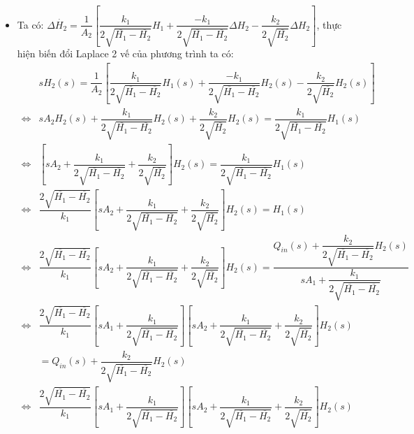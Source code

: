 \begin{enumerate}[\it a.]
\begin{itemize}
                    \item Ta có: $\Delta \dot{H_2} = \dfrac{1}{A_2} \left[{\dfrac{k_1}{2 \sqrt{\overline{H_1} - \overline{H_2}}} H_1 + \dfrac{-k_1}{2 \sqrt{\overline{H_1} - \overline{H_2}}} \Delta H_2 - \dfrac{k_2}{2 \sqrt{\overline{H_2}}} \Delta H_2}\right]$, thực hiện biến đổi Laplace 2 vế của phương trình ta có:
                        \begin{align}
                            & s H_2(s) = \dfrac{1}{A_2} \left[{\dfrac{k_1}{2 \sqrt{\overline{H_1} - \overline{H_2}}} H_1(s) + \dfrac{-k_1}{2 \sqrt{\overline{H_1} - \overline{H_2}}} H_2(s) - \dfrac{k_2}{2 \sqrt{\overline{H_2}}} H_2(s)}\right] \\
                            \Longleftrightarrow & s A_2 H_2(s) + \dfrac{k_1}{2 \sqrt{\overline{H_1} - \overline{H_2}}} H_2(s) + \dfrac{k_2}{2 \sqrt{\overline{H_2}}} H_2(s) = \dfrac{k_1}{2 \sqrt{\overline{H_1} - \overline{H_2}}} H_1(s) \\
                            \Longleftrightarrow & \left[{s A_2 + \dfrac{k_1}{2 \sqrt{\overline{H_1} - \overline{H_2}}} + \dfrac{k_2}{2 \sqrt{\overline{H_2}}}}\right] H_2(s) = \dfrac{k_1}{2 \sqrt{\overline{H_1} - \overline{H_2}}} H_1(s) \\
                            \Longleftrightarrow & \dfrac{2\sqrt{\overline{H_1} - \overline{H_2}}}{k_1} \left[{s A_2 + \dfrac{k_1}{2 \sqrt{\overline{H_1} - \overline{H_2}}} + \dfrac{k_2}{2 \sqrt{\overline{H_2}}}}\right] H_2(s) = H_1(s) \\
                            \Longleftrightarrow & \dfrac{2\sqrt{\overline{H_1} - \overline{H_2}}}{k_1} \left[{s A_2 + \dfrac{k_1}{2 \sqrt{\overline{H_1} - \overline{H_2}}} + \dfrac{k_2}{2 \sqrt{\overline{H_2}}}}\right] H_2(s) = \dfrac{Q_{in}(s) + \dfrac{k_2}{2\sqrt{\overline{H_1} - \overline{H_2}}} H_2(s)}{s A_1 + \dfrac{k_1}{2\sqrt{\overline{H_1} - \overline{H_2}}}} \\
                            \Longleftrightarrow & \dfrac{2\sqrt{\overline{H_1} - \overline{H_2}}}{k_1} \left[{s A_1 + \dfrac{k_1}{2\sqrt{\overline{H_1} - \overline{H_2}}}}\right] \left[{s A_2 + \dfrac{k_1}{2 \sqrt{\overline{H_1} - \overline{H_2}}} + \dfrac{k_2}{2 \sqrt{\overline{H_2}}}}\right] H_2(s) \nonumber \\
                            & = Q_{in}(s) + \dfrac{k_2}{2 \sqrt{\overline{H_1} - \overline{H_2}}} H_2(s) \\
                            \Longleftrightarrow & \dfrac{2\sqrt{\overline{H_1} - \overline{H_2}}}{k_1} \left[{s A_1 + \dfrac{k_1}{2\sqrt{\overline{H_1} - \overline{H_2}}}}\right] \left[{s A_2 + \dfrac{k_1}{2 \sqrt{\overline{H_1} - \overline{H_2}}} + \dfrac{k_2}{2 \sqrt{\overline{H_2}}}}\right] H_2(s) \nonumber \\

\end{align}
\end{itemize}
\end{enumerate}
